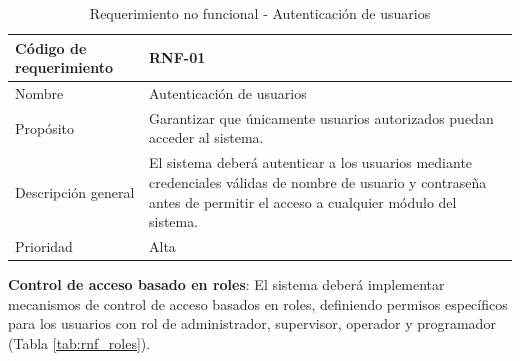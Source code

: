 \begin{table}[H]
    \centering
    \caption{Requerimiento no funcional - Autenticación de usuarios}
    \label{tab:rnf_autenticacion}
    \begin{tabularx}{\textwidth}{|X|X|}
        \hline
        Código de requerimiento & RNF-01                                                                                                                                                                  \\ \hline
        Nombre                  & Autenticación de usuarios                                                                                                                                               \\ \hline
        Propósito               & Garantizar que únicamente usuarios autorizados puedan acceder al sistema.                                                                                               \\ \hline
        Descripción general     & El sistema deberá autenticar a los usuarios mediante credenciales válidas de nombre de usuario y contraseña antes de permitir el acceso a cualquier módulo del sistema. \\ \hline
        Prioridad               & Alta                                                                                                                                                                    \\ \hline
    \end{tabularx}
\end{table}


\textbf{Control de acceso basado en roles}: El sistema deberá implementar mecanismos de control de acceso basados en roles, definiendo permisos específicos para los usuarios con rol de administrador, supervisor, operador y programador (Tabla \ref{tab:rnf_roles}).

